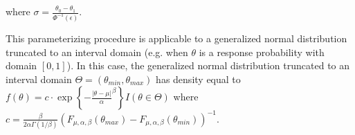 \documentclass[useAMS,usenatbib,referee]{biom}
\begin{document}
where $\sigma=\frac{\theta_0-\theta_1}{\Phi^{-1}(\epsilon)}$.
%

This parameterizing procedure is applicable to a generalized normal distribution truncated to an interval domain (e.g. when $\theta$ is a response probability with domain $[0,1]$). In this case, the generalized normal distribution truncated to an interval domain $\Theta=(\theta_{min},\theta_{max})$ has density equal to $f(\theta)=c\cdot\exp\left\{-\frac{|\theta-\mu|}{\alpha}^{\beta}\right\}{I(\theta\in \Theta)}$ where $c=\frac{\beta}{2\alpha \Gamma(1/\beta)}({F_{\mu,\alpha,\beta}(\theta_{max})-F_{\mu,\alpha,\beta}(\theta_{min})})^{-1}$.


%
%
%
\end{document}

